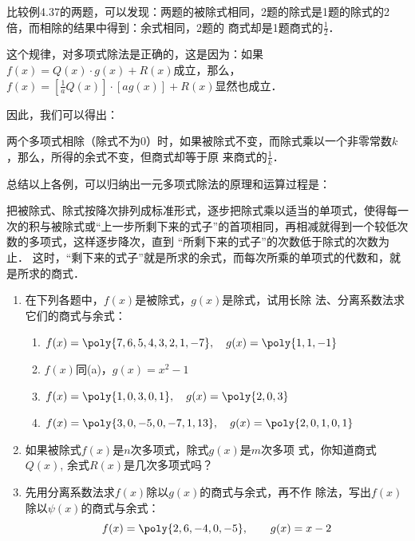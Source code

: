 比较例4.37的两题，可以发现：两题的被除式相同，2题的除式是1题的除式的2倍，而相除的结果中得到：余式相同，2题的
商式却是1题商式的$\frac{1}{2}$．

这个规律，对多项式除法是正确的，这是因为：如果$f(x)=Q(x)\cdot g(x)+R(x)$成立，那么，$f(x)=\left[\frac{1}{a}Q(x)\right]\cdot [ag(x)]+R(x)$显然也成立．

因此，我们可以得出：

\begin{blk}{}
    两个多项式相除（除式不为0）时，如果被除式不变，而除式乘以一个非零常数$k$，那么，所得的余式不变，但商式却等于原
来商式的$\frac{1}{k}$．
\end{blk}

总结以上各例，可以归纳出一元多项式除法的原理和运算过程是：

把被除式、除式按降次排列成标准形式，逐步把除式乘以适当的单项式，使得每一次的积与被除式或“上一步所剩下来的式子”的首项相同，再相减就得到一个较低次数的多项式，这样逐步降次，直到
“所剩下来的式子”的次数低于除式的次数为止．
这时，“剩下来的式子”就是所求的余式，而每次所乘的单项式的代数和，就是所求的商式．

\begin{ex}
\begin{enumerate}
    \item 在下列各题中，$f(x)$是被除式，$g(x)$是除式，试用长除
    法、分离系数法求它们的商式与余式：
    \begin{enumerate}
        \item $f(x)=\poly{7,6,5,4,3,2,1,-7},\quad g(x)=\poly{1,1,-1}$
        \item $f(x)$同(a)，$g(x)=x^2-1$
        \item $f(x)=\poly{1,0,3,0,1},\quad g(x)=\poly{2,0,3}$
        \item $f(x)=\poly{3,0,-5,0,-7,1,13},\quad g(x)=\poly{2,0,1,0,1}$
    \end{enumerate}

    \item 如果被除式$f(x)$是$n$次多项式，除式$g(x)$是$m$次多项
    式，你知道商式$Q(x)$, 余式$R(x)$是几次多项式吗？
    \item 先用分离系数法求$f(x)$除以$g(x)$的商式与余式，再不作
    除法，写出$f(x)$除以$\psi(x)$的商式与余式：
    \[f(x)=\poly{2,6,-4,0,-5},\qquad g(x)=x-2\]
\begin{enumerate}
\end{enumerate}

\end{enumerate}

\end{ex}



